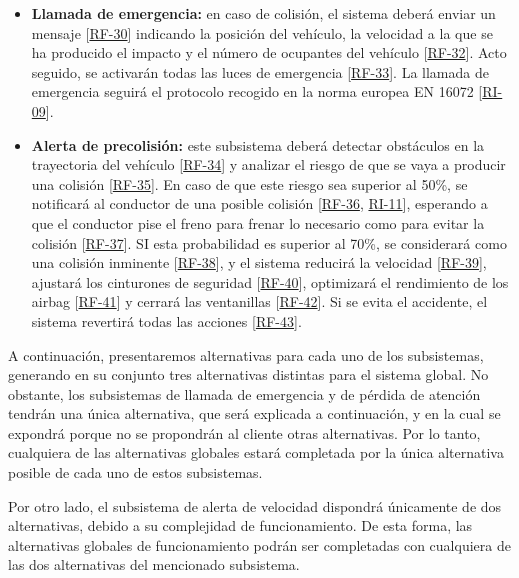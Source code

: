 \begin{itemize}[-]
\item \textbf{Llamada de emergencia:} en caso de colisión, el sistema deberá enviar un mensaje [\hyperref[tab:RF-30]{RF-30}] indicando la posición del vehículo, la velocidad a la que se ha producido el impacto y el número de ocupantes del vehículo [\hyperref[tab:RF-32]{RF-32}]. Acto seguido, se activarán todas las luces de emergencia [\hyperref[tab:RF-33]{RF-33}]. La llamada de emergencia seguirá el protocolo recogido en la norma europea EN 16072 [\hyperref[tab:RI-09]{RI-09}].
\item \textbf{Alerta de precolisión:} este subsistema deberá detectar obstáculos en la trayectoria del vehículo [\hyperref[tab:RF-34]{RF-34}] y analizar el riesgo de que se vaya a producir una colisión [\hyperref[tab:RF-35]{RF-35}]. En caso de que este riesgo sea superior al 50\%, se notificará al conductor de una posible colisión [\hyperref[tab:RF-36]{RF-36}, \hyperref[tab:RI-11]{RI-11}], esperando a que el conductor pise el freno para frenar lo necesario como para evitar la colisión [\hyperref[tab:RF-37]{RF-37}]. SI esta probabilidad es superior al 70\%, se considerará como una colisión inminente [\hyperref[tab:RF-38]{RF-38}], y el sistema reducirá la velocidad [\hyperref[tab:RF-39]{RF-39}], ajustará los cinturones de seguridad [\hyperref[tab:RF-40]{RF-40}], optimizará el rendimiento de los airbag [\hyperref[tab:RF-41]{RF-41}] y cerrará las ventanillas [\hyperref[tab:RF-42]{RF-42}]. Si se evita el accidente, el sistema revertirá todas las acciones [\hyperref[tab:RF-43]{RF-43}].
\end{itemize}

A continuación, presentaremos alternativas para cada uno de los subsistemas, generando en su conjunto tres alternativas distintas para el sistema global. No obstante, los subsistemas de llamada de emergencia y de pérdida de atención tendrán una única alternativa, que será explicada a continuación, y en la cual se expondrá porque no se propondrán al cliente otras alternativas. Por lo tanto, cualquiera de las alternativas globales estará completada por la única alternativa posible de cada uno de estos subsistemas.

Por otro lado, el subsistema de alerta de velocidad dispondrá únicamente de dos alternativas, debido a su complejidad de funcionamiento. De esta forma, las alternativas globales de funcionamiento podrán ser completadas con cualquiera de las dos alternativas del mencionado subsistema.
